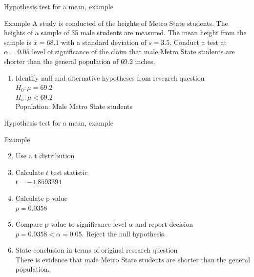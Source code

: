 \documentclass[xcolor=table]{beamer}
\begin{document}
\begin{frame}{Hypothesis test for a mean, example}
\begin{exampleblock}{Example}
\large
A study is conducted of the heights of Metro State students. The heights of a sample of 35 male students are measured. The mean height from the sample is $\bar x = 68.1$ with a standard deviation of $s=3.5$. Conduct a test at $\alpha=0.05$ level of significance of the claim that male Metro State students are shorter than the general population of 69.2 inches.
\begin{enumerate}
\pause\item Identify null and alternative hypotheses from research question\\
\pause$H_0: \mu = 69.2$\\
$H_a: \mu < 69.2$\\
Population: Male Metro State students
\end{enumerate}
\end{exampleblock}
\end{frame}

\begin{frame}{Hypothesis test for a mean, example}
\begin{exampleblock}{Example}
\large
\begin{enumerate}
\setcounter{enumi}{1}

\item Use a t distribution
\pause\item Calculate $t$ test statistic\\
\pause$t=-1.8593394$
\pause\item Calculate p-value\\
\pause$p = 0.0358$
\pause\item Compare p-value to significance level $\alpha$ and report decision\\
\pause$p = 0.0358 < \alpha = 0.05$. Reject the null hypothesis.
\pause\item State conclusion in terms of original research question\\
\pause There is evidence that male Metro State students are shorter than the general population.
\end{enumerate}

\end{exampleblock}
\end{frame}
\end{document}
